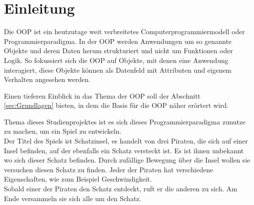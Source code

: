 \documentclass[
	12pt, %
	a4paper,
	listof=totoc, %
	bibliography=totoc, %
	numbers=noenddot, %
	ngerman, %
	headsepline, %
	oneside %
	]{scrbook} %
\begin{document}
\newpage

\tableofcontents{}

\listoffigures

%

\printnoidxglossaries

\clearpage



\chapter{Einleitung}\label{sec:einleitung}
Die \gls{OOP} ist ein heutzutage weit verbreitetes Computerprogrammiermodell oder Programmierparadigma. In der \gls{OOP} werden Anwendungen um so genannte Objekte und deren Daten herum strukturiert und nicht um Funktionen oder Logik. So fokussiert sich die \gls{OOP} auf Objekte, mit denen eine Anwendung interagiert, diese Objekte können als Datenfeld mit Attributen und eigenem Verhalten angesehen werden.

Einen tieferen Einblick in das Thema der \gls{OOP} soll der Abschnitt \ref{sec:Grundlagen} bieten, in dem die Basis für die \gls{OOP} näher erörtert wird.

Thema dieses Studienprojektes ist es sich dieses Programmierparadigma zunutze zu machen, um ein Spiel zu entwickeln.\\
Der Titel des Spiels ist \glqq Schatzinsel\grqq, es handelt von drei Piraten, die sich auf einer Insel befinden, auf der ebenfalls ein Schatz versteckt ist. Es ist ihnen unbekannt wo sich dieser Schatz befinden. Durch zufällige Bewegung über die Insel wollen sie versuchen diesen Schatz zu finden. Jeder der Piraten hat verschiedene Eigenschaften, wie zum Beispiel Geschwindigkeit.\\
Sobald einer der Piraten den Schatz entdeckt, ruft er die anderen zu sich. Am Ende versammeln sie sich alle um den Schatz.
\end{document}
